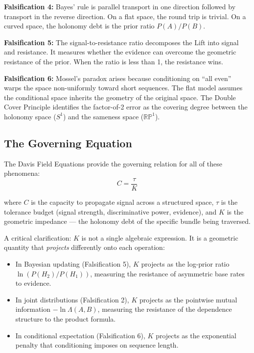 \documentclass[12pt]{article}
\begin{document}
\textbf{Falsification 4:} Bayes' rule is parallel transport in one direction followed by transport in the reverse direction. On a flat space, the round trip is trivial. On a curved space, the holonomy debt is the prior ratio $P(A)/P(B)$.

\textbf{Falsification 5:} The signal-to-resistance ratio decomposes the Lift into signal and resistance. It measures whether the evidence can overcome the geometric resistance of the prior. When the ratio is less than 1, the resistance wins.

\textbf{Falsification 6:} Mossel's paradox arises because conditioning on ``all even'' warps the space non-uniformly toward short sequences. The flat model assumes the conditional space inherits the geometry of the original space. The Double Cover Principle \cite{davis2026doublecover} identifies the factor-of-2 error as the covering degree between the holonomy space ($S^1$) and the sameness space ($\mathbb{RP}^1$).

\subsection{The Governing Equation}

The Davis Field Equations \cite{davis2025field} provide the governing relation for all of these phenomena:
\begin{equation}
C = \frac{\tau}{K}
\end{equation}

where $C$ is the capacity to propagate signal across a structured space, $\tau$ is the tolerance budget (signal strength, discriminative power, evidence), and $K$ is the geometric impedance --- the holonomy debt of the specific bundle being traversed.

A critical clarification: $K$ is not a single algebraic expression. It is a geometric quantity that \textit{projects} differently onto each operation:
\begin{itemize}[nosep]
\item In Bayesian updating (Falsification 5), $K$ projects as the log-prior ratio $\ln(P(H_2)/P(H_1))$, measuring the resistance of asymmetric base rates to evidence.
\item In joint distributions (Falsification 2), $K$ projects as the pointwise mutual information $-\ln \Lambda(A,B)$, measuring the resistance of the dependence structure to the product formula.
\item In conditional expectation (Falsification 6), $K$ projects as the exponential penalty that conditioning imposes on sequence length.
\end{itemize}
\end{document}
